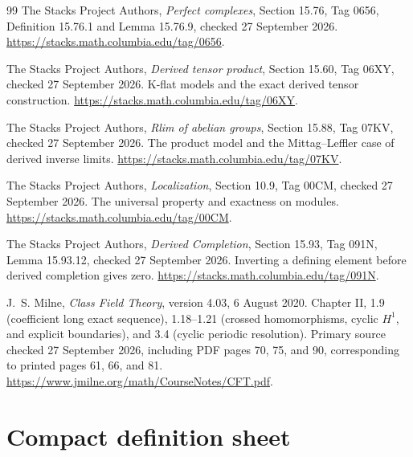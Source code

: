 \documentclass[11pt]{article}
\theoremstyle{definition}
\theoremstyle{remark}
\begin{document}
\begin{thebibliography}{99}
The Stacks Project Authors,
\emph{Perfect complexes}, Section 15.76, Tag 0656,
Definition 15.76.1 and Lemma 15.76.9, checked 27 September 2026.
\url{https://stacks.math.columbia.edu/tag/0656}.

The Stacks Project Authors,
\emph{Derived tensor product}, Section 15.60, Tag 06XY,
checked 27 September 2026. K-flat models and the exact derived tensor construction.
\url{https://stacks.math.columbia.edu/tag/06XY}.

The Stacks Project Authors,
\emph{Rlim of abelian groups}, Section 15.88, Tag 07KV,
checked 27 September 2026. The product model and the Mittag--Leffler case of derived inverse limits.
\url{https://stacks.math.columbia.edu/tag/07KV}.

The Stacks Project Authors,
\emph{Localization}, Section 10.9, Tag 00CM,
checked 27 September 2026. The universal property and exactness on modules.
\url{https://stacks.math.columbia.edu/tag/00CM}.

The Stacks Project Authors,
\emph{Derived Completion}, Section 15.93, Tag 091N,
Lemma 15.93.12, checked 27 September 2026. Inverting a defining element before derived completion gives zero.
\url{https://stacks.math.columbia.edu/tag/091N}.

J.~S. Milne, \emph{Class Field Theory}, version 4.03, 6 August 2020.
Chapter II, 1.9 (coefficient long exact sequence), 1.18--1.21 (crossed homomorphisms, cyclic $H^1$, and explicit boundaries), and 3.4 (cyclic periodic resolution). Primary source checked 27 September 2026, including PDF pages 70, 75, and 90, corresponding to printed pages 61, 66, and 81.
\url{https://www.jmilne.org/math/CourseNotes/CFT.pdf}.

\end{thebibliography}

\appendix
\section{Compact definition sheet}
\end{document}

